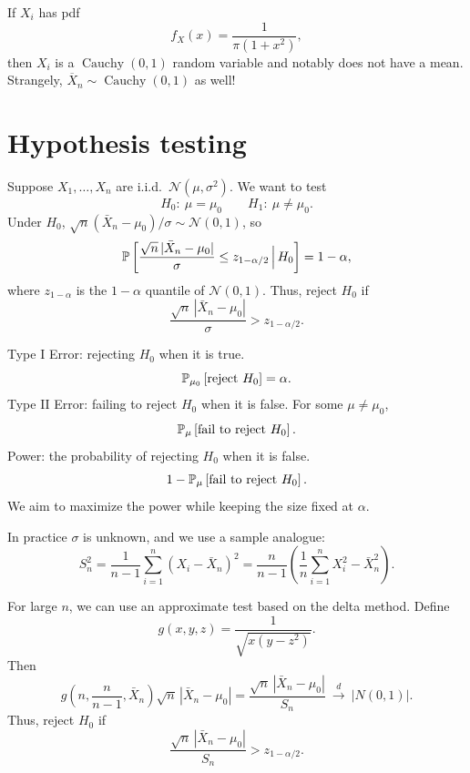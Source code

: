 \begin{remark}	If $X_i$ has pdf
	\[
		f_X(x)=\frac{1}{\pi(1+x^2)},
	\]
	then $X_i$ is a $\operatorname{Cauchy}(0,1)$ random variable and notably does not have a mean. Strangely, $\overline{X}_n \sim \operatorname{Cauchy}(0,1)$ as well!
\end{remark}

\section{Hypothesis testing}

\begin{example}	Suppose $X_1,\ldots,X_n$ are i.i.d.\ $\mathcal{N}(\mu,\sigma^2)$. We want to test
	\[
		H_0:\ \mu=\mu_0
		\qquad
		H_1:\ \mu\neq \mu_0.
	\]
	Under $H_0$, $\sqrt{n}(\bar{X}_n-\mu_0)/\sigma \sim \mathcal{N}(0,1)$, so
	\[
		\P\left[\frac{\sqrt{n}\,|\bar{X}_n-\mu_0|}{\sigma}\le z_{1-\alpha/2}\,\Big|\,H_0 \right]
		=1-\alpha,
	\]
	where $z_{1-\alpha}$ is the $1-\alpha$ quantile of $\mathcal{N}(0,1)$.
	Thus, reject $H_0$ if
	\[
		\frac{\sqrt{n}\,|\bar{X}_n-\mu_0|}{\sigma}>z_{1-\alpha/2}.
	\]
\end{example}

\begin{remark}	Type I Error: rejecting $H_0$ when it is true.
	\[
		\P_{\mu_0}\left[\text{reject }H_0\right]=\alpha.
	\]
	Type II Error: failing to reject $H_0$ when it is false. For some $\mu\neq \mu_0$,
	\[
		\P_{\mu}\left[\text{fail to reject }H_0\right].
	\]
	Power: the probability of rejecting $H_0$ when it is false.
	\[
		1-\P_{\mu}\left[\text{fail to reject }H_0\right].
	\]
	We aim to maximize the power while keeping the size fixed at $\alpha$.
\end{remark}

\begin{remark}	In practice $\sigma$ is unknown, and we use a sample analogue:
	\[
		S_n^2
		=
		\frac{1}{n-1}\sum_{i=1}^n (X_i-\bar{X}_n)^2
		=
		\frac{n}{n-1}\left(\frac{1}{n}\sum_{i=1}^n X_i^2-\bar{X}_n^2\right).
	\]
\end{remark}

\begin{remark}	For large $n$, we can use an approximate test based on the delta method.
	Define
	\[
		g(x,y,z)=\frac{1}{\sqrt{x(y-z^2)}}.
	\]
	Then
	\[
		g\left(n,\frac{n}{n-1},\bar{X}_n\right)\sqrt{n}\,|\bar{X}_n-\mu_0|
		=
		\frac{\sqrt{n}\,|\bar{X}_n-\mu_0|}{S_n}
		\ \xrightarrow{d}\ |N(0,1)|.
	\]
	Thus, reject $H_0$ if
	\[
		\frac{\sqrt{n}\,|\bar{X}_n-\mu_0|}{S_n}>z_{1-\alpha/2}.
	\]
\end{remark}

